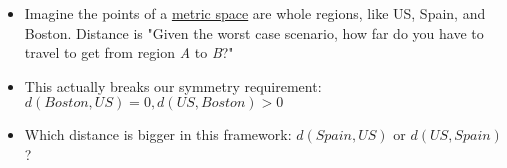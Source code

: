 \begin{itemize}
    \item Imagine the points of a \href{doc/1 math/Seven Sketches in Compositionality/Chapter 2: Resource theories/3 Enrichment/3 Lawvere metric spaces/1 Metric space}{metric space} are whole regions, like US, Spain, and Boston. Distance is "Given the worst case scenario, how far do you have to travel to get from region \emph{A} to \emph{B}?"
    \item This actually breaks our symmetry requirement: $d(Boston,US)=0, d(US,Boston) > 0$
    \item Which distance is bigger in this framework: $d(Spain,US)$ or $d(US,Spain)$?
  \end{itemize}